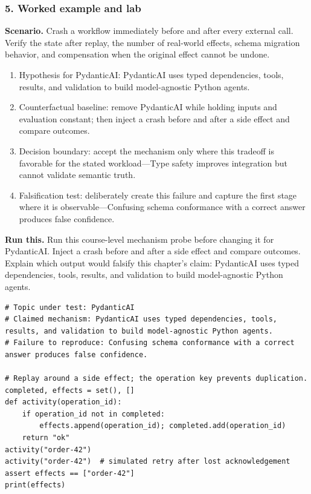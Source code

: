 \subsubsection*{5. Worked example and lab}
\textbf{Scenario.} Crash a workflow immediately before and after every external call. Verify the state after replay, the number of real-world effects, schema migration behavior, and compensation when the original effect cannot be undone.
\begin{enumerate}
\item Hypothesis for PydanticAI: PydanticAI uses typed dependencies, tools, results, and validation to build model-agnostic Python agents.
\item Counterfactual baseline: remove PydanticAI while holding inputs and evaluation constant; then inject a crash before and after a side effect and compare outcomes.
\item Decision boundary: accept the mechanism only where this tradeoff is favorable for the stated workload—Type safety improves integration but cannot validate semantic truth.
\item Falsification test: deliberately create this failure and capture the first stage where it is observable—Confusing schema conformance with a correct answer produces false confidence.
\end{enumerate}
\textbf{Run this.} Run this course-level mechanism probe before changing it for PydanticAI. Inject a crash before and after a side effect and compare outcomes. Explain which output would falsify this chapter's claim: PydanticAI uses typed dependencies, tools, results, and validation to build model-agnostic Python agents.
\begin{Verbatim}[fontsize=\scriptsize]
# Topic under test: PydanticAI
# Claimed mechanism: PydanticAI uses typed dependencies, tools, results, and validation to build model-agnostic Python agents.
# Failure to reproduce: Confusing schema conformance with a correct answer produces false confidence.

# Replay around a side effect; the operation key prevents duplication.
completed, effects = set(), []
def activity(operation_id):
    if operation_id not in completed:
        effects.append(operation_id); completed.add(operation_id)
    return "ok"
activity("order-42")
activity("order-42")  # simulated retry after lost acknowledgement
assert effects == ["order-42"]
print(effects)
\end{Verbatim}
